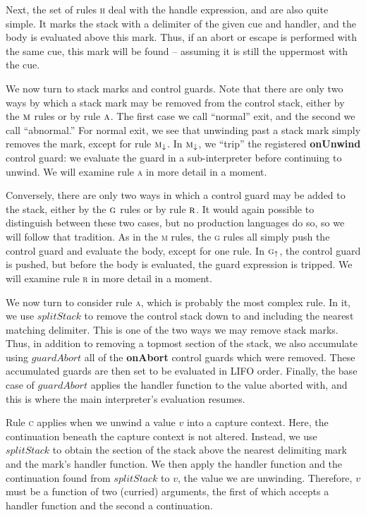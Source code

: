 \documentclass[11pt]{article}
\begin{document}
Next, the set of rules \textsc{h} deal with the \textsf{handle} expression, and are also quite simple.
It marks the stack with a delimiter of the given cue and handler, and the body is evaluated above this mark.
Thus, if an abort or escape is performed with the same cue, this mark will be found -- assuming it is still the uppermost with the cue.

We now turn to stack marks and control guards.
Note that there are only two ways by which a stack mark may be removed from the control stack, either by the $\textsc{m}$ rules or by rule $\textsc{a}$.
The first case we call ``normal'' exit, and the second we call ``abnormal.''
For normal exit, we see that unwinding past a stack mark simply removes the mark, except for rule $\textsc{m}_\downarrow$.
In $\textsc{m}_\downarrow$, we ``trip'' the registered \textbf{onUnwind} control guard: we evaluate the guard in a sub-interpreter before continuing to unwind.
We will examine rule \textsc{a} in more detail in a moment.

Conversely, there are only two ways in which a control guard may be added to the stack, either by the $\textsc{g}$ rules or by rule $\textsc{r}$.
It would again possible to distinguish between these two cases, but no production languages do so, so we will follow that tradition.
As in the \textsc{m} rules, the \textsc{g} rules all simply push the control guard and evaluate the body, except for one rule.
In $\textsc{g}_\uparrow$, the control guard is pushed, but before the body is evaluated, the guard expression is tripped.
We will examine rule \textsc{r} in more detail in a moment.

We now turn to consider rule \textsc{a}, which is probably the most complex rule.
In it, we use $splitStack$ to remove the control stack down to and including the nearest matching delimiter.
This is one of the two ways we may remove stack marks.
Thus, in addition to removing a topmost section of the stack, we also accumulate using $guardAbort$ all of the \textbf{onAbort} control guards which were removed.
These accumulated guards are then set to be evaluated in LIFO order.
Finally, the base case of $guardAbort$ applies the handler function to the value aborted with, and this is where the main interpreter's evaluation resumes.

Rule \textsc{c} applies when we unwind a value $v$ into a capture context.
Here, the continuation beneath the capture context is not altered.
Instead, we use $splitStack$ to obtain the section of the stack above the nearest delimiting mark and the mark's handler function.
We then apply the handler function and the continuation found from $splitStack$ to $v$, the value we are unwinding.
Therefore, $v$ must be a function of two (curried) arguments, the first of which accepts a handler function and the second a continuation.
\end{document}

